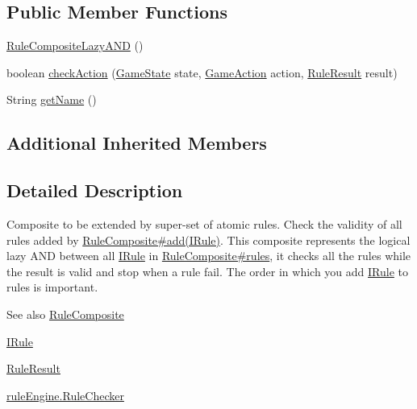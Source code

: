 \subsection*{Public Member Functions}
\begin{DoxyCompactItemize}
\item 
\mbox{\hyperlink{classrule_engine_1_1rules_1_1new_rules_1_1_rule_composite_lazy_a_n_d_acdb9b48d5c228adef177149bc34995d9}{Rule\+Composite\+Lazy\+A\+ND}} ()
\item 
boolean \mbox{\hyperlink{classrule_engine_1_1rules_1_1new_rules_1_1_rule_composite_lazy_a_n_d_a58204904f81f350b7cf05aa13e0fd43b}{check\+Action}} (\mbox{\hyperlink{classgame_1_1game_state_1_1_game_state}{Game\+State}} state, \mbox{\hyperlink{classrule_engine_1_1_game_action}{Game\+Action}} action, \mbox{\hyperlink{classrule_engine_1_1_rule_result}{Rule\+Result}} result)
\item 
String \mbox{\hyperlink{classrule_engine_1_1rules_1_1new_rules_1_1_rule_composite_lazy_a_n_d_a1fabc2dad0cccb638ee3154918c90f0d}{get\+Name}} ()
\end{DoxyCompactItemize}
\subsection*{Additional Inherited Members}


\subsection{Detailed Description}
Composite to be extended by super-\/set of atomic rules. Check the validity of all rules added by \mbox{\hyperlink{classrule_engine_1_1rules_1_1new_rules_1_1_rule_composite_a4970c2904b55542c6c7323195a38c845}{Rule\+Composite\#add(\+I\+Rule)}}. This composite represents the logical lazy A\+ND between all \mbox{\hyperlink{interfacerule_engine_1_1rules_1_1new_rules_1_1_i_rule}{I\+Rule}} in \mbox{\hyperlink{classrule_engine_1_1rules_1_1new_rules_1_1_rule_composite_a0f873c0c52e3cf4815d5b09a5ca2ae7f}{Rule\+Composite\#rules}}, it checks all the rules while the result is valid and stop when a rule fail. The order in which you add \mbox{\hyperlink{interfacerule_engine_1_1rules_1_1new_rules_1_1_i_rule}{I\+Rule}} to rules is important.

\begin{DoxySeeAlso}{See also}
\mbox{\hyperlink{classrule_engine_1_1rules_1_1new_rules_1_1_rule_composite}{Rule\+Composite}} 

\mbox{\hyperlink{interfacerule_engine_1_1rules_1_1new_rules_1_1_i_rule}{I\+Rule}} 

\mbox{\hyperlink{classrule_engine_1_1_rule_result}{Rule\+Result}} 

\mbox{\hyperlink{classrule_engine_1_1_rule_checker}{rule\+Engine.\+Rule\+Checker}} 
\end{DoxySeeAlso}


